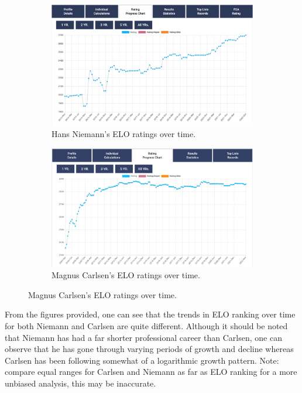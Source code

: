 \documentclass[12pt, letterpaper, titlepage]{article}
\begin{document}
\begin{figure}
    \begin{subfigure}{.5\textwidth}
    \includegraphics[scale=0.2]{niemann_rating.png}
    \caption{Hans Niemann's ELO ratings over time. \citep{hansniemannrating}}
    \label{fig:sfig1}
    \end{subfigure}

    \begin{subfigure}{.5\textwidth}
    \includegraphics[scale=0.45]{carlsen_rating.png}
    \caption{Magnus Carlsen's ELO ratings over time. \citep{hansniemannrating}}
    \label{fig:sfig2}
    \end{subfigure}
\label{fig:fig}
\end{figure}


From the figures provided, one can see that the trends in ELO ranking over time for both Niemann and Carlsen are quite different. Although it should be noted that Niemann has had a far shorter professional career than Carlsen, one can observe that he has gone through varying periods of growth and decline whereas Carlsen has been following somewhat of a logarithmic growth pattern. Note: compare equal ranges for Carlsen and Niemann as far as ELO ranking for a more unbiased analysis, this may be inaccurate.
\end{document}
